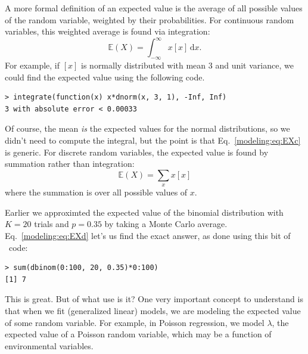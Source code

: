 A more formal definition of an expected value is the average of all
possible values of the random variable, weighted by their
probabilities. For continuous random variables, this weighted average
is found via integration:
\begin{equation}
  \mathbb{E}(X) = \int_{-\infty}^{\infty} x[x] \, \text{d}{x}.
  \label{modeling:eq:EXc}
\end{equation}
For example, if $[x]$ is normally distributed with mean 3 and unit
variance, we could find the expected value using the following code.
\begin{verbatim}
> integrate(function(x) x*dnorm(x, 3, 1), -Inf, Inf)
3 with absolute error < 0.00033
\end{verbatim}
Of course, the mean \textit{is} the expected values for the normal
distributions, so we didn't need to compute the integral, but the
point is that Eq.~\ref{modeling:eq:EXc} is generic. For discrete
random variables, the expected value is found by summation rather than
integration:
\begin{equation}
  \mathbb{E}(X) = \sum_{x} x[x]
  \label{modeling:eq:EXd}
\end{equation}
where the summation is over all possible values of $x$.

Earlier we
approximted the expected value of the binomial distribution
with $K=20$ trials and $p=0.35$ by taking a Monte Carlo
average. Eq.~\ref{modeling:eq:EXd} let's us
find the exact answer, as done using this bit of \R~code:
\begin{verbatim}
> sum(dbinom(0:100, 20, 0.35)*0:100)
[1] 7
\end{verbatim}
This is great. But of what use is it? One very
important concept to understand is that when we fit (generalized
linear) models, we are modeling the expected value of some random
variable. For example, in Poisson regression, we model $\lambda$, the
expected value of a Poisson random variable, which may be a function
of environmental variables.

